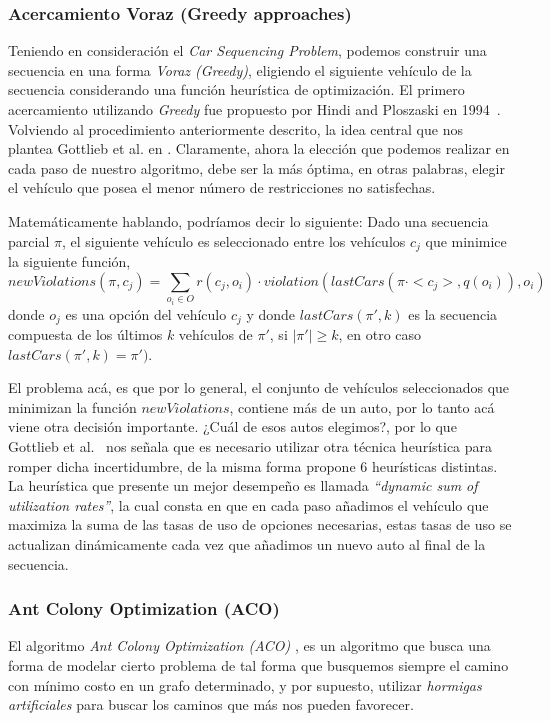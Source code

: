 \subsubsection{Acercamiento Voraz (Greedy approaches)}
Teniendo en consideración el \emph{Car Sequencing Problem}, podemos construir una secuencia
en una forma \emph{Voraz (Greedy)}, eligiendo el siguiente vehículo de la secuencia
considerando una función heurística de optimización.
El primero acercamiento utilizando \emph{Greedy} fue propuesto por
Hindi and Ploszaski en 1994~\cite{HP94}. Volviendo al procedimiento anteriormente descrito, la idea
central que nos plantea Gottlieb et al. en \cite{GPS03}. Claramente, ahora la elección que podemos
realizar en cada paso de nuestro algoritmo, debe ser la más óptima, en otras palabras,
elegir el vehículo que posea el menor número de restricciones no satisfechas.

Matemáticamente hablando, podríamos decir lo siguiente:
Dado una secuencia parcial $\pi$, el siguiente vehículo es seleccionado entre los vehículos $c_j$
que minimice la siguiente función,
$$newViolations(\pi, c_j) = \sum_{o_{i}\in O}r(c_j,o_i)\cdot violation(lastCars(\pi\cdot <c_j>,q(o_i)),o_i)$$
donde $o_j$ es una opción del vehículo $c_j$ y donde $lastCars(\pi',k)$ es la secuencia compuesta de los
últimos $k$ vehículos de $\pi'$, si $|\pi'| \geq k$, en otro caso $lastCars(\pi' , k) = \pi')$.

El problema acá, es que por lo general, el conjunto de vehículos seleccionados que minimizan la función
$newViolations$, contiene más de un auto, por lo tanto acá viene otra decisión importante. ¿Cuál de esos
autos elegimos?, por lo que Gottlieb et al.~\cite{GPS03} nos señala que es necesario utilizar otra técnica heurística para 
romper dicha incertidumbre, de la misma forma propone 6 heurísticas distintas. La heurística que presente
un mejor desempeño es llamada \emph{``dynamic sum of utilization rates''}, la cual consta en que en cada paso
añadimos el vehículo que maximiza la suma de las tasas de uso de opciones necesarias, estas tasas de uso se actualizan
dinámicamente cada vez que añadimos un nuevo auto al final de la secuencia.

\subsubsection{Ant Colony Optimization (ACO)}
El algoritmo \emph{Ant Colony Optimization (ACO)} \cite{DS05}, es un algoritmo que
busca una forma de modelar cierto problema de tal forma que busquemos siempre el camino
con mínimo costo en un grafo determinado, y por supuesto, utilizar \emph{hormigas artificiales}
para buscar los caminos que más nos pueden favorecer.

